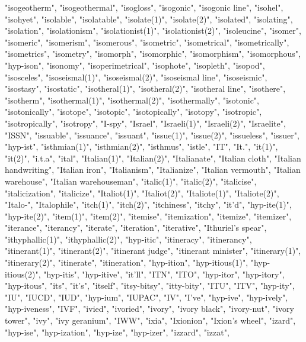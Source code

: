 "isogeotherm",
"isogeothermal",
"isogloss",
"isogonic",
"isogonic line",
"isohel",
"isohyet",
"isolable",
"isolatable",
"isolate(1)",
"isolate(2)",
"isolated",
"isolating",
"isolation",
"isolationism",
"isolationist(1)",
"isolationist(2)",
"isoleucine",
"isomer",
"isomeric",
"isomerism",
"isomerous",
"isometric",
"isometrical",
"isometrically",
"isometrics",
"isometry",
"isomorph",
"isomorphic",
"isomorphism",
"isomorphous",
"hyp-ison",
"isonomy",
"isoperimetrical",
"isophote",
"isopleth",
"isopod",
"isosceles",
"isoseismal(1)",
"isoseismal(2)",
"isoseismal line",
"isoseismic",
"isostasy",
"isostatic",
"isotheral(1)",
"isotheral(2)",
"isotheral line",
"isothere",
"isotherm",
"isothermal(1)",
"isothermal(2)",
"isothermally",
"isotonic",
"isotonically",
"isotope",
"isotopic",
"isotopically",
"isotopy",
"isotropic",
"isotropically",
"isotropy",
"I-spy",
"Israel",
"Israeli(1)",
"Israeli(2)",
"Israelite",
"ISSN",
"issuable",
"issuance",
"issuant",
"issue(1)",
"issue(2)",
"issueless",
"issuer",
"hyp-ist",
"isthmian(1)",
"isthmian(2)",
"isthmus",
"istle",
"IT",
"It.",
"it(1)",
"it(2)",
"i.t.a",
"ital",
"Italian(1)",
"Italian(2)",
"Italianate",
"Italian cloth",
"Italian handwriting",
"Italian iron",
"Italianism",
"Italianize",
"Italian vermouth",
"Italian warehouse",
"Italian warehouseman",
"italic(1)",
"italic(2)",
"italicise",
"italicization",
"italicize",
"Italiot(1)",
"Italiot(2)",
"Italiote(1)",
"Italiote(2)",
"Italo-",
"Italophile",
"itch(1)",
"itch(2)",
"itchiness",
"itchy",
"it'd",
"hyp-ite(1)",
"hyp-ite(2)",
"item(1)",
"item(2)",
"itemise",
"itemization",
"itemize",
"itemizer",
"iterance",
"iterancy",
"iterate",
"iteration",
"iterative",
"Ithuriel's spear",
"ithyphallic(1)",
"ithyphallic(2)",
"hyp-itic",
"itineracy",
"itinerancy",
"itinerant(1)",
"itinerant(2)",
"itinerant judge",
"itinerant minister",
"itinerary(1)",
"itinerary(2)",
"itinerate",
"itineration",
"hyp-ition",
"hyp-itious(1)",
"hyp-itious(2)",
"hyp-itis",
"hyp-itive",
"it'll",
"ITN",
"ITO",
"hyp-itor",
"hyp-itory",
"hyp-itous",
"its",
"it's",
"itself",
"itsy-bitsy",
"itty-bity",
"ITU",
"ITV",
"hyp-ity",
"IU",
"IUCD",
"IUD",
"hyp-ium",
"IUPAC",
"IV",
"I've",
"hyp-ive",
"hyp-ively",
"hyp-iveness",
"IVF",
"ivied",
"ivoried",
"ivory",
"ivory black",
"ivory-nut",
"ivory tower",
"ivy",
"ivy geranium",
"IWW",
"ixia",
"Ixionion",
"Ixion's wheel",
"izard",
"hyp-ise",
"hyp-ization",
"hyp-ize",
"hyp-izer",
"izzard",
"izzat",
